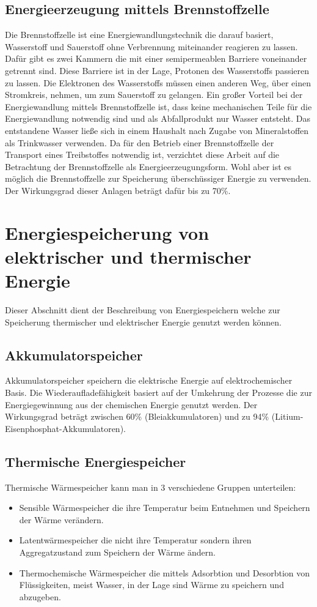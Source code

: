     \subsection{Energieerzeugung mittels Brennstoffzelle}
    Die Brennstoffzelle ist eine Energiewandlungstechnik die darauf basiert, Wasserstoff und Sauerstoff ohne Verbrennung miteinander reagieren zu lassen.
    Dafür gibt es zwei Kammern die mit einer semipermeablen Barriere voneinander getrennt sind.
    Diese Barriere ist in der Lage, Protonen des Wasserstoffs passieren zu lassen.
    Die Elektronen des Wasserstoffs müssen einen anderen Weg, über einen Stromkreis, nehmen, um zum Sauerstoff zu gelangen.
    Ein großer Vorteil bei der Energiewandlung mittels Brennstoffzelle ist, dass keine mechanischen Teile für die Energiewandlung notwendig sind und als Abfallprodukt nur Wasser entsteht.
    Das entstandene Wasser ließe sich in einem Haushalt nach Zugabe von Mineralstoffen als Trinkwasser verwenden.
    Da für den Betrieb einer Brennstoffzelle der Transport eines Treibstoffes notwendig ist, verzichtet diese Arbeit auf die Betrachtung der Brennstoffzelle als Energieerzeugungsform.
    Wohl aber ist es möglich die Brennstoffzelle zur Speicherung überschüssiger Energie zu verwenden.
    Der Wirkungsgrad dieser Anlagen beträgt dafür bis zu 70\%.\cite{Art:ENERGYENV}

  \section{Energiespeicherung von elektrischer und thermischer Energie}
    Dieser Abschnitt dient der Beschreibung von Energiespeichern welche zur Speicherung thermischer und elektrischer Energie genutzt werden können.
    \subsection{Akkumulatorspeicher}
    Akkumulatorspeicher speichern die elektrische Energie auf elektrochemischer Basis. Die Wiederaufladefähigkeit basiert auf der Umkehrung der Prozesse die zur Energiegewinnung aus der chemischen Energie genutzt werden.
    Der Wirkungsgrad beträgt zwischen 60\% (Bleiakkumulatoren) und zu 94\% (Litium-Eisenphosphat-Akkumulatoren).

    \subsection{Thermische Energiespeicher}
    Thermische Wärmespeicher kann man in 3 verschiedene Gruppen unterteilen: 
    \begin{itemize}
      \item Sensible Wärmespeicher die ihre Temperatur beim Entnehmen und Speichern der Wärme verändern.
      \item Latentwärmespeicher die nicht ihre Temperatur sondern ihren Aggregatzustand zum Speichern der Wärme ändern.
      \item Thermochemische Wärmespeicher die mittels Adsorbtion und Desorbtion von Flüssigkeiten, meist Wasser, in der Lage sind Wärme zu speichern und abzugeben.
    \end{itemize}
